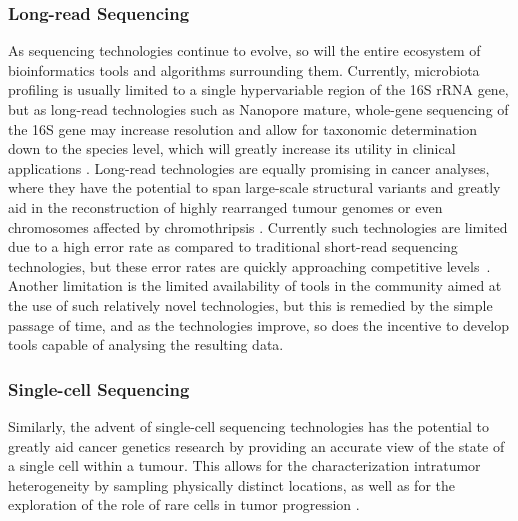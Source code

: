 \subsubsection{Long-read Sequencing}
As sequencing technologies continue to evolve, so will the entire ecosystem of bioinformatics tools and algorithms surrounding them. Currently, microbiota profiling is usually limited to a single hypervariable region of the 16S rRNA gene, but as long-read technologies such as Nanopore mature, whole-gene sequencing of the 16S gene may increase resolution and allow for taxonomic determination down to the species level, which will greatly increase its utility in clinical applications \cite{toma2014single,franzen2015improved}. Long-read technologies are equally promising in cancer analyses, where they have the potential to span large-scale structural variants and greatly aid in the reconstruction of highly rearranged tumour genomes or even chromosomes affected by chromothripsis \cite{norris2016nanopore,nattest2018complex}. Currently such technologies are limited due to a high error rate as compared to traditional short-read sequencing technologies, but these error rates are quickly approaching competitive levels~\cite{kraft2019long}. Another limitation is the limited availability of tools in the community aimed at the use of such relatively novel technologies, but this is remedied by the simple passage of time, and as the technologies improve, so does the incentive to develop tools capable of analysing the resulting data.

\subsubsection{Single-cell Sequencing}
Similarly, the advent of single-cell sequencing technologies has the potential to greatly aid cancer genetics research by providing an accurate view of the state of a single cell within a tumour. This allows for the characterization intratumor heterogeneity by sampling physically distinct locations, as well as for the exploration of the role of rare cells in tumor progression \cite{navin2015first}.

